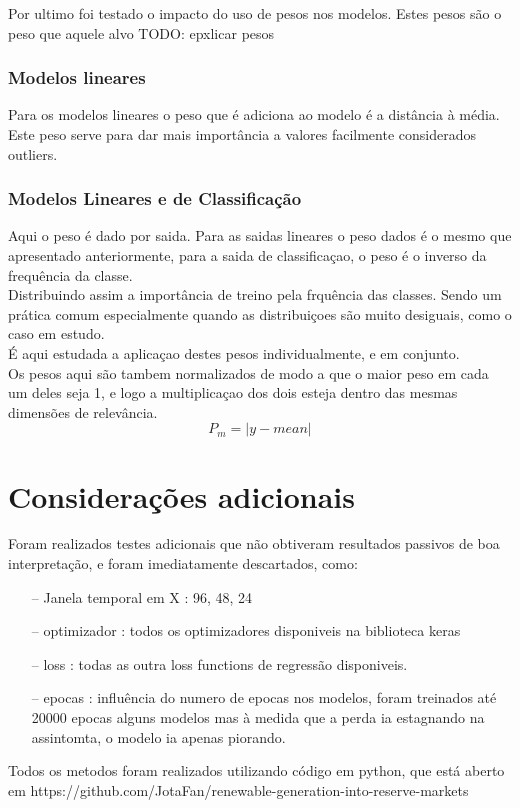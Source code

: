 Por ultimo foi testado o impacto do uso de pesos nos modelos. Estes pesos são o peso que aquele alvo TODO: epxlicar pesos

\subsubsection{Modelos lineares}

Para os modelos lineares o peso que é adiciona ao modelo é a distância à média.\\
Este peso serve para dar mais importância a valores facilmente considerados outliers.\\



\subsubsection{Modelos Lineares e de Classificação}
Aqui o peso é dado por saida. Para as saidas lineares o peso dados é o mesmo que apresentado anteriormente, para a saida de classificaçao, o peso é o inverso da frequência da classe.\\
Distribuindo assim a importância de treino pela frquência das classes. Sendo um prática comum especialmente quando as distribuiçoes são muito desiguais, como o caso em estudo.\\
É aqui estudada a aplicaçao destes pesos individualmente, e em conjunto. \\
Os pesos aqui são tambem normalizados de modo a que o maior peso em cada um deles seja 1, e logo a multiplicaçao dos dois esteja dentro das mesmas dimensões de relevância.\\


\begin{equation} \label{eq:peso_media} 
    P_m = \left| y - mean \right| 
\end{equation}

\section{Considerações adicionais  \label{se:metodos_plus}}

Foram realizados testes adicionais que não obtiveram resultados passivos de boa interpretação, e foram imediatamente descartados, como:

\begin{itemize}
    \item[--] Janela temporal em X : 96, 48, 24
    \item[--] optimizador : todos os optimizadores disponiveis na biblioteca keras
    \item[--] loss : todas as outra loss functions de regressão disponiveis.
    \item[--] epocas : influência do numero de epocas nos modelos, foram treinados até 20000 epocas alguns modelos mas à medida que a perda ia estagnando na assintomta, o modelo ia apenas piorando.
\end{itemize}


Todos os metodos foram realizados utilizando código em python, que está aberto em https://github.com/JotaFan/renewable-generation-into-reserve-markets
